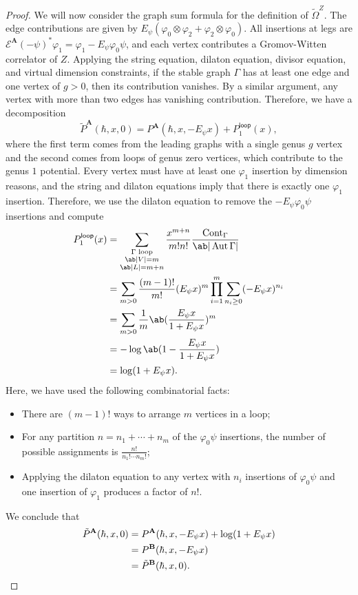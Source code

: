 \documentclass[10pt]{amsart}
\theoremstyle{definition}
\theoremstyle{remark}
\theoremstyle{plain}
\theoremstyle{definition}
\theoremstyle{remark}
\newcommand{\bA}{\mathbf{A}}
\newcommand{\bB}{\mathbf{B}}
\newcommand{\msc}[1]{\mathscr{#1}}
\newcommand{\mr}[1]{\mathrm{#1}}
\newcommand{\ms}[1]{\mathsf{#1}}
\newcommand{\1}{\mathbf{1}}
\newcommand{\2}{\mathbf{2}}
\newcommand{\3}{\mathbf{3}}
\newcommand{\sloop}{\ms{loop}}
\DeclareMathOperator{\Aut}{Aut}
\numberwithin{equation}{section}
\begin{document}
\begin{proof}
    We will now consider the graph sum formula for the definition of $\tilde{\Omega}^Z$. The edge contributions are given by $E_{\psi}(\varphi_0 \otimes \varphi_2 + \varphi_2 \otimes \varphi_0)$. All insertions at legs are $\msc{E}^{\bA}(-\psi)^* \varphi_1 = \varphi_1 - E_{\psi} \varphi_0 \psi$, and each vertex contributes a Gromov-Witten correlator of $Z$. Applying the string equation, dilaton equation, divisor equation, and virtual dimension constraints, if the stable graph $\Gamma$ has at least one edge and one vertex of $g > 0$, then its contribution vanishes. By a similar argument, any vertex with more than two edges has vanishing contribution. Therefore, we have a decomposition
    \[ \tilde{P}^{\bA}(\hbar, x, 0) = P^{\bA}(\hbar, x, -E_{\psi}x) + P_1^{\sloop}(x), \]
    where the first term comes from the leading graphs with a single genus $g$ vertex and the second comes from loops of genus zero vertices, which contribute to the genus $1$ potential. Every vertex must have at least one $\varphi_1$ insertion by dimension reasons, and the string and dilaton equations imply that there is exactly one $\varphi_1$ insertion. Therefore, we use the dilaton equation to remove the $-E_{\psi}\varphi_0 \psi$ insertions and compute
    \begin{align*}
        P_1^{\sloop}(x) &= \sum_{\substack{\Gamma \text{ loop} \\ \ab|V| = m \\ \ab|L| = m+n}} \frac{x^{m+n}}{m!n!}\frac{\mr{Cont}_{\Gamma}}{\ab|\Aut \Gamma|} \\
        &= \sum_{m > 0} \frac{(m-1)!}{m!} (E_{\psi}x)^m \prod_{i=1}^m \sum_{n_i \geq 0} (-E_{\psi}x)^{n_i} \\
        &= \sum_{m > 0} \frac{1}{m} \ab(\frac{E_{\psi}x}{1+E_{\psi}x})^m \\
        &= -\log \ab(1- \frac{E_{\psi}x}{1+E_{\psi}x}) \\
        &= \log (1+E_{\psi}x).
    \end{align*}
    Here, we have used the following combinatorial facts:
    \begin{itemize}
        \item There are $(m-1)!$ ways to arrange $m$ vertices in a loop;
        \item For any partition $n = n_1 + \cdots + n_m$ of the $\varphi_0 \psi$ insertions, the number of possible assignments is $\frac{n!}{n_1! \cdots n_m!}$;
        \item Applying the dilaton equation to any vertex with $n_i$ insertions of $\varphi_0 \psi$ and one insertion of $\varphi_1$ produces a factor of $n!$.
    \end{itemize}
    We conclude that 
    \begin{align*}
        \tilde{P}^{\bA}(\hbar, x, 0) &= P^{\bA}(\hbar, x, -E_{\psi}x) + \log(1+E_{\psi}x) \\
        &= P^{\bB}(\hbar, x, -E_{\psi}x) \\
        &= \tilde{P}^{\bB}(\hbar, x, 0). \qedhere
    \end{align*}
\end{proof}
\end{document}
